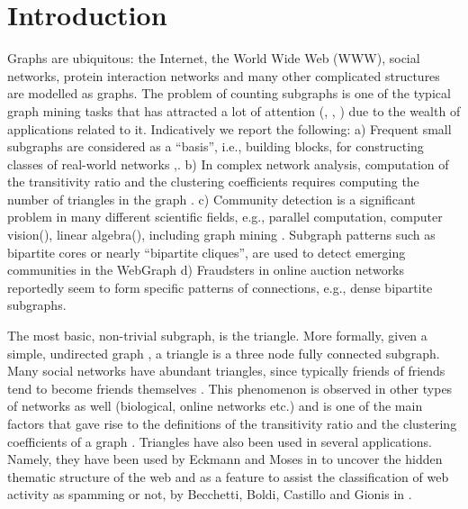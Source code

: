 \documentclass{llncs}
\begin{document}
\section{Introduction}
\label{sec:intro}


Graphs are ubiquitous: the Internet, the World Wide Web (WWW), social networks, protein interaction networks 
and many other complicated structures are modelled as graphs. 
The problem of counting subgraphs is one of the typical graph mining tasks that has attracted 
a lot of attention (\cite{gspan}, \cite{closegraph}, \cite{yan2004} ) due to the wealth of applications related to it.
Indicatively we report the following:
a) Frequent small subgraphs are considered as a ``basis'', i.e., building blocks, for 
constructing classes of real-world networks \cite{milo:triangles},\cite{arena:com}.
b) In complex network analysis, computation of the transitivity ratio and the clustering 
coefficients requires computing the number of triangles in the graph \cite{newman:structure}. 
c) Community detection is a significant problem in many different scientific fields, e.g., parallel computation,
computer vision(\cite{ncut}), linear algebra(\cite{metis}), including graph mining \cite{leskovec,myra,metis}. 
Subgraph patterns such as bipartite cores or nearly ``bipartite cliques'', are used to detect emerging communities in the WebGraph \cite{kumar}
d) Fraudsters in online auction networks reportedly \cite{polo} seem to form specific patterns of connections, e.g., dense bipartite subgraphs.

The most basic, non-trivial subgraph, is the triangle. More formally, 
given a simple, undirected graph , a triangle is a three node fully connected subgraph. 
Many social networks have abundant triangles, since typically friends
of friends tend to become friends themselves \cite{faust:social}. This phenomenon is observed
in other types of networks as well (biological, online networks etc.) and is one of the main factors that 
gave rise to the definitions of the transitivity ratio  and the clustering coefficients of a graph \cite{newman:structure}.
Triangles have also been used in several applications. Namely, they have been used 
by Eckmann and Moses in \cite{eckman:thematic} to uncover the hidden thematic structure of the web and as a feature
to assist the classification of web activity as spamming or not, 
by Becchetti, Boldi, Castillo and Gionis in \cite{gionis:spam}.
\end{document}
